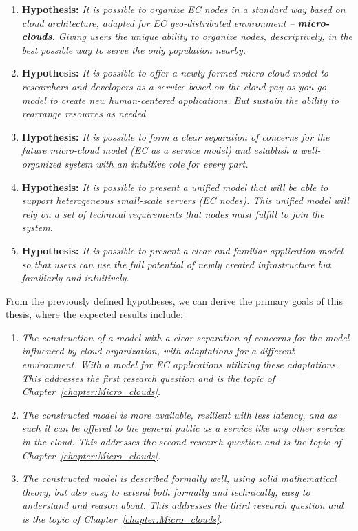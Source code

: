 \begin{enumerate}[start=1,label={(\bfseries \arabic*)}]
	\item \textbf{Hypothesis:} \textit{It is possible to organize EC nodes in a standard way based on cloud architecture, adapted for EC geo-distributed environment -- \textbf{micro-clouds}. Giving users the unique ability to organize nodes, descriptively, in the best possible way to serve the only population nearby.}
	\item \textbf{Hypothesis:} \textit{It is possible to offer a newly formed micro-cloud model to researchers and developers as a service based on the cloud pay as you go model to create new human-centered applications. But sustain the ability to rearrange resources as needed.}
	\item \textbf{Hypothesis:} \textit{It is possible to form a clear separation of concerns for the future micro-cloud model (EC as a service model) and establish a well-organized system with an intuitive role for every part.} 
	\item \textbf{Hypothesis:} \textit{It is possible to present a unified model that will be able to support heterogeneous small-scale servers (EC nodes). This unified model will rely on a set of technical requirements that nodes must fulfill to join the system.}
	\item \textbf{Hypothesis:} \textit{It is possible to present a clear and familiar application model so that users can use the full potential of newly created infrastructure but familiarly and intuitively.}
\end{enumerate}

\noindent
From the previously defined hypotheses, we can derive the primary goals of this thesis, where the expected results include:

\begin{enumerate}[start=1,label={(\bfseries \arabic*)}]
	\item \textit{The construction of a model with a clear separation of concerns for the model influenced by cloud organization, with adaptations for a different environment. With a model for EC applications utilizing these adaptations. This addresses the first research question and is the topic of Chapter~\ref{chapter:Micro_clouds}.}
	\item \textit{The constructed model is more available, resilient with less latency, and as such it can be offered to the general public as a service like any other service in the cloud. This addresses the second research question and is the topic of Chapter~\ref{chapter:Micro_clouds}.}
	\item \textit{The constructed model is described formally well, using solid mathematical theory, but also easy to extend both formally and technically, easy to understand and reason about. This addresses the third research question and is the topic of Chapter~\ref{chapter:Micro_clouds}.}
\end{enumerate}
%
%
